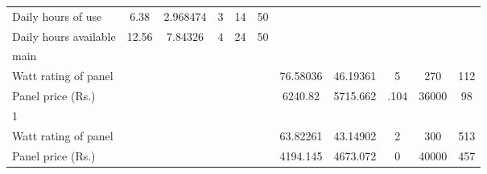 \begin{table}[htbp]
\begin{tabular}{l*{2}{ccccc}}
Daily hours of use  &        6.38&    2.968474&           3&          14&          50&            &            &            &            &            \\
Daily hours available&       12.56&     7.84326&           4&          24&          50&            &            &            &            &            \\
\midrule
main                &            &            &            &            &            &            &            &            &            &            \\
Watt rating of panel&            &            &            &            &            &    76.58036&    46.19361&           5&         270&         112\\
Panel price (Rs.)   &            &            &            &            &            &     6240.82&    5715.662&        .104&       36000&          98\\
\midrule
1                   &            &            &            &            &            &            &            &            &            &            \\
Watt rating of panel&            &            &            &            &            &    63.82261&    43.14902&           2&         300&         513\\
Panel price (Rs.)   &            &            &            &            &            &    4194.145&    4673.072&           0&       40000&         457\\
\bottomrule
\end{tabular}
\end{table}

